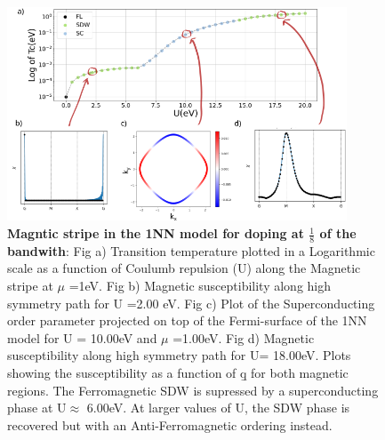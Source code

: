 \documentclass[12pt]{article}
\begin{document}
\begin{figure}[htbp]  %
    \centering
    \includegraphics[width=0.9\textwidth]{1NNstripes.png}  %
    \caption{\textbf{Magntic stripe in the 1NN model for doping at $\frac{1}{8}$ of the bandwith}: Fig a) Transition temperature plotted in a Logarithmic scale as a function of Coulumb repulsion (U) along the Magnetic stripe at $\mu$ =1eV. 
       Fig b) Magnetic susceptibility along high symmetry path for U =2.00 eV. 
       Fig c) Plot of the Superconducting order parameter projected on top of the Fermi-surface of the 1NN model for U = 10.00eV and $\mu$ =1.00eV.
       Fig d) Magnetic susceptibility along high symmetry path for U= 18.00eV. Plots showing the susceptibility as a function of \b{q} for both magnetic regions. The Ferromagnetic SDW is supressed by a superconducting phase at U$\approx$ 6.00eV. At larger values of U,  the SDW phase is recovered but with an Anti-Ferromagnetic ordering instead.  }
    \label{fig:1NN_stripes}
\end{figure}
\end{document}
